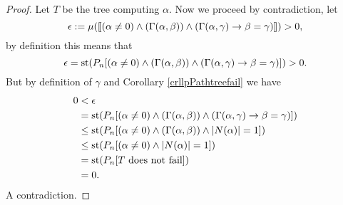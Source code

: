 \begin{proof}
Let $T$ be the tree computing $\alpha$. Now we proceed by contradiction, let
\[\epsilon:=\mu(\llbracket(\alpha\not=0)\land (\Gamma(\alpha,\beta)) \land(\Gamma(\alpha,\gamma) \to \beta=\gamma)\rrbracket)>0,\]
by definition this means that
\[\epsilon=\text{st}(P_n[(\alpha\not=0)\land (\Gamma(\alpha,\beta)) \land(\Gamma(\alpha,\gamma) \to \beta=\gamma)])>0.\]
But by definition of $\gamma$ and Corollary \ref{crllpPathtreefail} we have
\begin{align*}
0&<\epsilon\\
&=\text{st}(P_n[(\alpha\not=0)\land (\Gamma(\alpha,\beta)) \land(\Gamma(\alpha,\gamma) \to \beta=\gamma)])\\
&\leq\text{st}(P_n[(\alpha\not=0)\land (\Gamma(\alpha,\beta)) \land \left|{N(\alpha)}\right|=1])\\
&\leq\text{st}(P_n[(\alpha\not=0)\land \left|{N(\alpha)}\right|=1])\\
&=\text{st}(P_n[T\text{ does not fail}])\\
&=0.
\end{align*}
A contradiction.
\end{proof}
